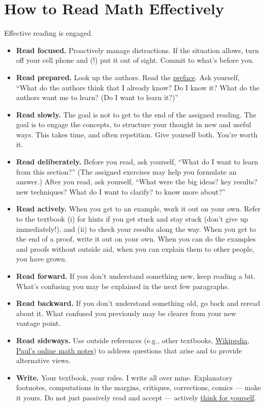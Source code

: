 \section{How to Read Math Effectively}

Effective reading is engaged.
\begin{itemize}
\item \textbf{Read focused.} Proactively manage distractions. If the situation allows, turn off your cell phone and (!) put it out of sight. Commit to what's before you.
\item \textbf{Read prepared.} Look up the authors. Read the \href{https://openstax.org/books/calculus-volume-2/pages/preface}{preface}. Ask yourself, ``What do the authors think that I already know? Do I know it? What do the authors want me to learn? (Do I want to learn it?)''
\item \textbf{Read slowly.} The goal is not to get to the end of the assigned reading. The goal is to engage the concepts, to structure your thought in new and useful ways. This takes time, and often repetition. Give yourself both. You're worth it.
\item \textbf{Read deliberately.} Before you read, ask yourself, ``What do I want to learn from this section?'' (The assigned exercises may help you formulate an answer.) After you read, ask yourself, ``What were the big ideas? key results? new techniques? What do I want to clarify? to know more about?''
\item \textbf{Read actively.} When you get to an example, work it out on your own. Refer to the textbook (i) for hints if you get stuck and stay stuck (don't give up immediately!), and (ii) to check your results along the way. When you get to the end of a proof, write it out on your own. When you can do the examples and proofs without outside aid, when you can explain them to other people, you have grown.
\item \textbf{Read forward.} If you don't understand something new, keep reading a bit. What's confusing you may be explained in the next few paragraphs.
\item \textbf{Read backward.} If you don't understand something old, go back and reread about it. What confused you previously may be clearer from your new vantage point.
\item \textbf{Read sideways.} Use outside references (e.g., other textbooks, \href{https://www.wikipedia.org/}{Wikipedia}, \href{http://tutorial.math.lamar.edu/}{Paul's online math notes}) to address questions that arise and to provide alternative views.
\item \textbf{Write.} Your textbook, your rules. I write all over mine. Explanatory footnotes, computations in the margins, critiques, corrections, comics --- make it yours. %
Do not just passively read and accept --- actively \href{https://www.youtube.com/watch?v=tpeLSMKNFO4}{think for yourself}.
\end{itemize}